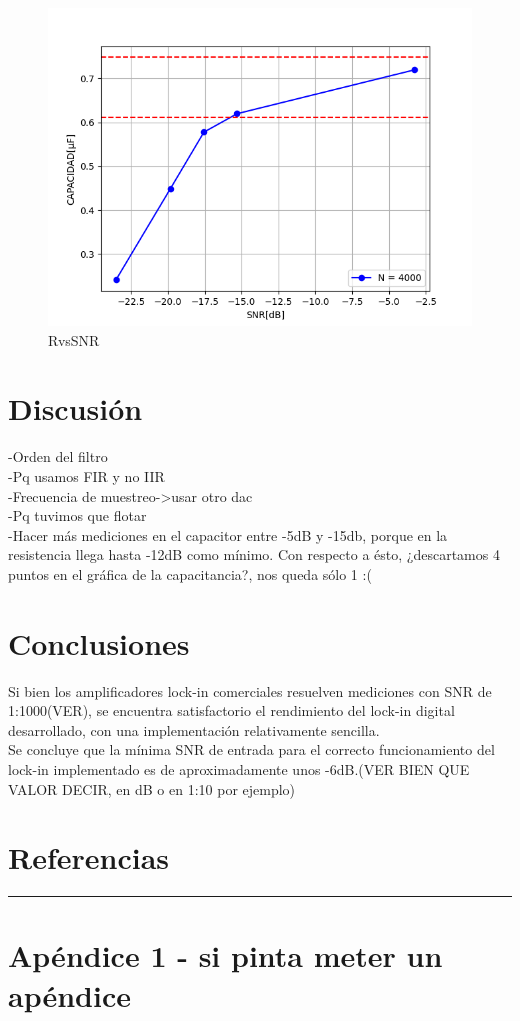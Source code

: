 \documentclass[11pt,a4paper]{extarticle}
\begin{document}
\begin{multicols}{2}
\begin{figure}[H]
	\centering
	\includegraphics[width=\linewidth]{Images/CvsSNR(segunda).png}
	\caption{RvsSNR}
	\label{fig:CvsSNR}
\end{figure}


\section{Discusión}
-Orden del filtro\\
-Pq usamos FIR y no IIR\\
-Frecuencia de muestreo->usar otro dac\\
-Pq tuvimos que flotar\\
-Hacer más mediciones en el capacitor entre -5dB y -15db, 
porque en la resistencia llega hasta -12dB como mínimo.
Con respecto a ésto, ¿descartamos 4 puntos en el gráfica de 
la capacitancia?, nos queda sólo 1 :(

\section{Conclusiones}

Si bien los amplificadores lock-in comerciales resuelven 
mediciones con SNR de 1:1000(VER), se encuentra satisfactorio 
el rendimiento del lock-in digital desarrollado, con 
una implementación relativamente sencilla.\\

Se concluye que la mínima SNR de entrada para el 
correcto funcionamiento del lock-in implementado es de 
aproximadamente unos -6dB.(VER BIEN QUE VALOR DECIR, 
en dB o en 1:10 por ejemplo)

\section{Referencias}




\end{multicols}
\newpage
\begin{appendices}
\vspace{-1em}
\hrule
\vspace{1em}
\normalsize
\section{Apéndice 1 - si pinta meter un apéndice}
\end{appendices}
\end{document}
